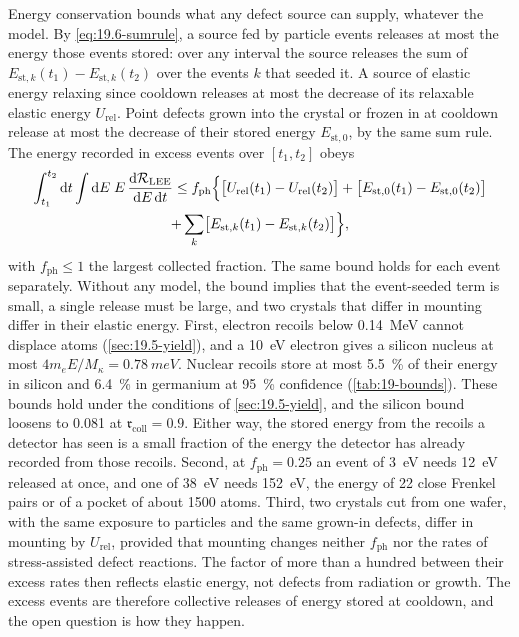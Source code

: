 Energy conservation bounds what any defect source can supply, whatever the model. By \cref{eq:19.6-sumrule}, a source fed by particle events releases at most the energy those events stored: over any interval the source releases the sum of $E_{\mathrm{st},k}(t_1) - E_{\mathrm{st},k}(t_2)$ over the events $k$ that seeded it. A source of elastic energy relaxing since cooldown releases at most the decrease of its relaxable elastic energy $U_{\mathrm{rel}}$. Point defects grown into the crystal or frozen in at cooldown release at most the decrease of their stored energy $E_{\mathrm{st},0}$, by the same sum rule. The energy recorded in excess events over $[t_1, t_2]$ obeys
\begin{multline}
  \int_{t_1}^{t_2}\mathrm{d} t\int\mathrm{d} E\;E\,\frac{\mathrm{d}\mathcal{R}_{\mathrm{LEE}}}{\mathrm{d} E\,\mathrm{d} t}
  \le f_{\mathrm{ph}}\Bigl\{\bigl[U_{\mathrm{rel}}(t_1) - U_{\mathrm{rel}}(t_2)\bigr] + \bigl[E_{\mathrm{st},0}(t_1) - E_{\mathrm{st},0}(t_2)\bigr] \\
  + \sum_k\bigl[E_{\mathrm{st},k}(t_1) - E_{\mathrm{st},k}(t_2)\bigr]\Bigr\} ,
  \label{eq:19.6-leebound}
\end{multline}
with $f_{\mathrm{ph}} \le 1$ the largest collected fraction. The same bound holds for each event separately. Without any model, the bound implies that the event-seeded term is small, a single release must be large, and two crystals that differ in mounting differ in their elastic energy. First, electron recoils below \SI{0.14}{MeV} cannot displace atoms (\cref{sec:19.5-yield}), and a \SI{10}{eV} electron gives a silicon nucleus at most $4m_eE/M_\kappa = \SI{0.78}{meV}$. Nuclear recoils store at most \SI{5.5}{\percent} of their energy in silicon and \SI{6.4}{\percent} in germanium at \SI{95}{\percent} confidence (\cref{tab:19-bounds}). These bounds hold under the conditions of \cref{sec:19.5-yield}, and the silicon bound loosens to 0.081 at $\mathfrak{r}_{\mathrm{coll}} = 0.9$. Either way, the stored energy from the recoils a detector has seen is a small fraction of the energy the detector has already recorded from those recoils. Second, at $f_{\mathrm{ph}} = 0.25$ an event of \SI{3}{eV} needs \SI{12}{eV} released at once, and one of \SI{38}{eV} needs \SI{152}{eV}, the energy of 22 close Frenkel pairs or of a pocket of about 1500 atoms. Third, two crystals cut from one wafer, with the same exposure to particles and the same grown-in defects, differ in mounting by $U_{\mathrm{rel}}$, provided that mounting changes neither $f_{\mathrm{ph}}$ nor the rates of stress-assisted defect reactions. The factor of more than a hundred between their excess rates then reflects elastic energy, not defects from radiation or growth. The excess events are therefore collective releases of energy stored at cooldown, and the open question is how they happen.

